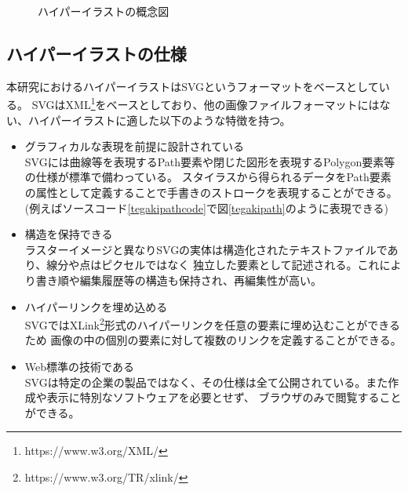 \begin{figure}[htbp]
    \begin{center}
     \end{center}
    \caption{ハイパーイラストの概念図}
\end{figure}

\subsection{ハイパーイラストの仕様}
本研究におけるハイパーイラストはSVG\cite{aboutsvg}というフォーマットをベースとしている。
SVGはXML\footnote{https://www.w3.org/XML/}をベースとしており、他の画像ファイルフォーマットにはない、ハイパーイラストに適した以下のような特徴を持つ。
\begin{itemize}
    \item グラフィカルな表現を前提に設計されている\\
    SVGには曲線等を表現するPath要素や閉じた図形を表現するPolygon要素等の仕様が標準で備わっている。
    スタイラスから得られるデータをPath要素の属性として定義することで手書きのストロークを表現することができる。
    (例えばソースコード\ref{tegakipathcode}で図\ref{tegakipath}のように表現できる)
    \item 構造を保持できる\\
    ラスターイメージと異なりSVGの実体は構造化されたテキストファイルであり、線分や点はピクセルではなく
    独立した要素として記述される。これにより書き順や編集履歴等の構造も保持され、再編集性が高い。
    \item ハイパーリンクを埋め込める\\
    SVGではXLink\footnote{https://www.w3.org/TR/xlink/}形式のハイパーリンクを任意の要素に埋め込むことができるため
    画像の中の個別の要素に対して複数のリンクを定義することができる。
    \item Web標準の技術である\\
    SVGは特定の企業の製品ではなく、その仕様は全て公開されている。また作成や表示に特別なソフトウェアを必要とせず、
    ブラウザのみで閲覧することができる。
\end{itemize}

